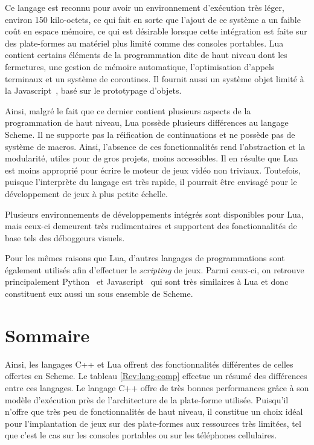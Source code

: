 \documentclass[12pt,twoside,letterpaper,francais]{book}
\begin{document}
Ce langage est reconnu pour avoir un environnement d'exécution très
léger, environ 150 kilo-octets, ce qui fait en sorte que l'ajout de ce
système a un faible coût en espace mémoire, ce qui est désirable
lorsque cette intégration est faite sur des plate-formes au matériel
plus limité comme des consoles portables. Lua contient certains
éléments de la programmation dite de haut niveau dont les fermetures,
une gestion de mémoire automatique, l'optimisation d'appels terminaux
et un système de coroutines. Il fournit aussi un système objet limité
à la Javascript~\cite{ECMA-262}, basé sur le prototypage d'objets.

Ainsi, malgré le fait que ce dernier contient plusieurs aspects de la
programmation de haut niveau, Lua possède plusieurs différences au
langage Scheme. Il ne supporte pas la réification de continuations et
ne possède pas de système de macros. Ainsi, l'absence de ces
fonctionnalités rend l'abstraction et la modularité, utiles pour de
gros projets, moins accessibles. Il en résulte que Lua est moins
approprié pour écrire le moteur de jeux vidéo non triviaux. Toutefois,
puisque l'interprète du langage est très rapide, il pourrait être
envisagé pour le dévelop\-pement de jeux à plus petite échelle.

Plusieurs environnements de développements intégrés sont disponibles
pour Lua, mais ceux-ci demeurent très rudimentaires et supportent des
fonctionnalités de base tels des déboggeurs visuels. 

Pour les mêmes raisons que Lua, d'autres langages de programmations
sont également utilisés afin d'effectuer le \textit{scripting} de
jeux. Parmi ceux-ci, on retrouve principalement Python~\cite{Python}
et Javascript~\cite{ECMA-262} qui sont très similaires à Lua et donc
constituent eux aussi un sous ensemble de Scheme.


\FloatBarrier
\section{Sommaire}
Ainsi, les langages C++ et Lua offrent des fonctionnalités différentes
de celles offertes en Scheme. Le tableau \ref{Rev:lang-comp} effectue
un résumé des différences entre ces langages. Le langage C++ offre de
très bonnes performances grâce à son modèle d'exécution près de
l'architecture de la plate-forme utilisée. Puisqu'il n'offre que très
peu de fonctionnalités de haut niveau, il constitue un choix idéal
pour l'implantation de jeux sur des plate-formes aux ressources très
limitées, tel que c'est le cas sur les consoles portables ou sur les
téléphones cellulaires.
\end{document}
